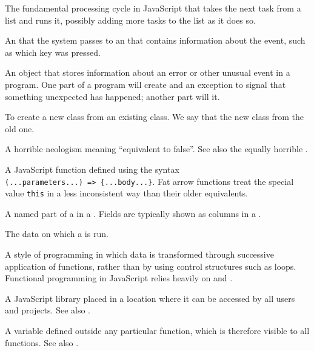 \begin{description}
The fundamental processing cycle in JavaScript that takes the next task from a
list and runs it, possibly adding more tasks to the list as it does so.

An  that the system passes to an  that contains information about the event, such as
which key was pressed.

An object that stores information about an error or other unusual event in a
program. One part of a program will create and  an exception
to signal that something unexpected has happened; another part will
 it.

To create a new class from an existing class. We say that the new class
 from the old one.

A horrible neologism meaning ``equivalent to false''. See also the equally
horrible .

A JavaScript function defined using the syntax \texttt{(...parameters...)\ ={\textgreater}\ \{...body...\}}.
Fat arrow functions treat the special value \texttt{this} in a less
inconsistent way than their older equivalents.

A named part of a  in a . Fields are typically shown as columns in a
.

The data on which a  is run.

A style of programming in which data is transformed through successive
application of functions, rather than by using control structures such as
loops. Functional programming in JavaScript relies heavily on
 and .

A JavaScript library placed in a location where it can be accessed by all
users and projects. See also .

A variable defined outside any particular function, which is therefore visible
to all functions. See also .


\end{description}
